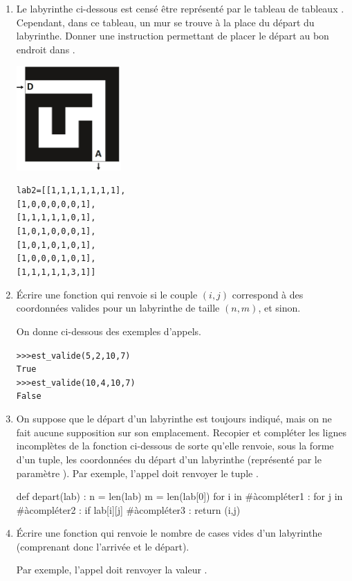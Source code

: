 \documentclass[11pt,a4paper,french,twoside]{PMCours}
\begin{document}
\begin{enumerate}
\item Le labyrinthe ci-dessous est censé être représenté par le tableau de tableaux .
Cependant, dans ce tableau, un mur se trouve à la place du départ du labyrinthe.
Donner une instruction permettant de placer le départ au bon endroit dans .
\begin{multicols}{2}
    \includegraphics[width=4cm]{BacBlanc2Sujet1_NSI2122-img2.png}

\begin{alltt}
lab2 = [[1, 1, 1, 1, 1, 1, 1],
        [1, 0, 0, 0, 0, 0, 1],
        [1, 1, 1, 1, 1, 0, 1],
        [1, 0, 1, 0, 0, 0, 1],
        [1, 0, 1, 0, 1, 0, 1],
        [1, 0, 0, 0, 1, 0, 1],
        [1, 1, 1, 1, 1, 3, 1]]
\end{alltt}
\end{multicols}
\item Écrire une fonction  qui renvoie  si le couple $(i,j)$
correspond à des coordonnées valides pour un labyrinthe de taille $(n,m)$, et  sinon.

On donne ci-dessous des exemples d'appels.
\begin{alltt}
>>> est\_valide(5, 2, 10, 7)
True
>>> est\_valide(10, 4, 10, 7)
False
\end{alltt}
\item On suppose que le départ d'un labyrinthe est toujours indiqué, mais on ne fait aucune
supposition sur son emplacement. Recopier et compléter les lignes incomplètes de la fonction  ci-dessous de sorte qu'elle renvoie, sous la forme d'un tuple, les coordonnées du départ d'un labyrinthe (représenté par le paramètre ). Par exemple, l'appel  doit renvoyer le tuple .
\begin{Python}
def depart(lab) :
    n = len(lab)
    m = len(lab[0])
    for i in #àcompléter1 : 
    	for j in #àcompléter2 :
    		if lab[i][j] #àcompléter3 :
    			return (i,j)
\end{Python}
\item Écrire une fonction  qui renvoie le nombre de cases vides d'un
labyrinthe (comprenant donc l'arrivée et le départ).

Par exemple, l'appel  doit renvoyer la valeur .
\end{enumerate}
\end{document}
